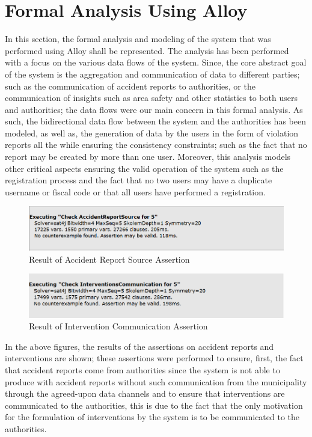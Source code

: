\section{Formal Analysis Using Alloy}
In this section, the formal analysis and modeling of the system that was performed using Alloy shall be represented. The analysis has been performed with a focus on the various data flows of the system. Since, the core abstract goal of the system is the aggregation and communication of data to different parties; such as the communication of accident reports to authorities, or the communication of insights such as area safety and other statistics to both users and authorities; the data flows were our main concern in this formal analysis. As such, the bidirectional data flow between the system and the authorities has been modeled, as well as, the generation of data by the users in the form of violation reports all the while ensuring the consistency constraints; such as the fact that no report may be created by more than one user. Moreover, this analysis models other critical aspects ensuring the valid operation of the system such as the registration process and the fact that no two users may have a duplicate username or fiscal code or that all users have performed a registration.

	
	
	\begin{figure}[H]	
		\centering
		\includegraphics[scale=0.6]{images/ReportSourceAssertion.png}
		\caption{Result of Accident Report Source Assertion}
	\end{figure}
	
	\begin{figure}[H]	
		\centering
		\includegraphics[scale=0.6]{images/InterventionCommAssertion.png}
		\caption{Result of Intervention Communication Assertion}
	\end{figure}	
		
In the above figures, the results of the assertions on accident reports and interventions are shown; these assertions were performed to ensure, first, the fact that accident reports come from authorities since the system is not able to produce with accident reports without such communication from the municipality through the agreed-upon data channels and to ensure that interventions are communicated to the authorities, this is due to the fact that the only motivation for the formulation of interventions by the system is to be communicated to the authorities.
	
